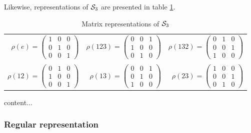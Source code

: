 	\begin{example}\label{ex:permS3}
		Likewise, representations of $\mathcal{S}_3$ are presented in table \ref{table:permS3}.
		\begin{table}[hbt!]
			\centering
			\begin{tabular}{r r r}
				$\rho(e) = 
				\begin{pmatrix}
					1 & 0 & 0 \\
					0 & 1 & 0 \\
					0 & 0 & 1
				\end{pmatrix}$ & 
				$\rho(123) = 
				\begin{pmatrix}
					0 & 0 & 1 \\
					1 & 0 & 0 \\
					0 & 1 & 0
				\end{pmatrix}$ & 
				$\rho(132) = 
				\begin{pmatrix}
					0 & 1 & 0 \\
					0 & 0 & 1 \\
					1 & 0 & 0
				\end{pmatrix}$ \\ & & \\
				$\rho(12) = 
				\begin{pmatrix}
					0 & 1 & 0 \\
					1 & 0 & 0 \\
					0 & 0 & 1
				\end{pmatrix}$ &
				$\rho(13) = 
				\begin{pmatrix}
					0 & 0 & 1 \\
					0 & 1 & 0 \\
					1 & 0 & 0
				\end{pmatrix}$ &
				$\rho(23) = 
				\begin{pmatrix}
					1 & 0 & 0 \\
					0 & 0 & 1 \\
					0 & 1 & 0
				\end{pmatrix}$
			\end{tabular}
			\caption{Matrix representations of $\mathcal{S}_3$}
			\label{table:permS3}
		\end{table}
	\end{example}
	
	\begin{example}
		content...
	\end{example}

\subsubsection{Regular representation}


